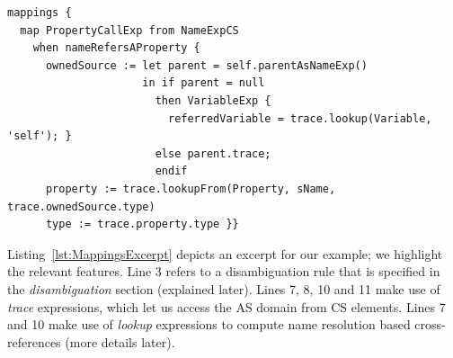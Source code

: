 \documentclass{llncs}
\begin{document}

\begin{lstlisting}[float, caption=Mappings section excerpt, label=lst:MappingsExcerpt, language=CS2AS]
mappings {
  map PropertyCallExp from NameExpCS 
    when nameRefersAProperty {
      ownedSource := let parent = self.parentAsNameExp()
                     in if parent = null
                       then VariableExp {
                         referredVariable = trace.lookup(Variable, 'self'); }
                       else parent.trace;
                       endif
      property := trace.lookupFrom(Property, sName, trace.ownedSource.type)
      type := trace.property.type }}
\end{lstlisting}

Listing~\ref{lst:MappingsExcerpt} depicts an excerpt for our example; we highlight the relevant features. Line 3 refers to a disambiguation rule that is specified in the \textit{disambiguation} section (explained later). Lines 7, 8, 10 and 11 make use of \textit{trace} expressions, which let us access the AS domain from CS elements. Lines 7 and 10 make use of \textit{lookup} expressions to compute name resolution based cross-references (more details later). 
\end{document}
